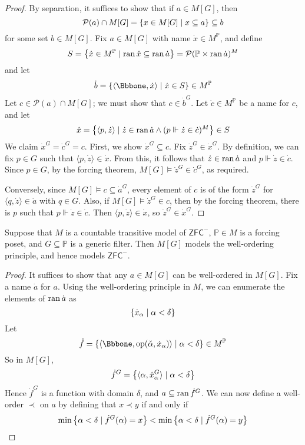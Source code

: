 \begin{proof}
    By separation, it suffices to show that if \( a \in M[G] \), then
    \[ \mathcal P(a) \cap M[G] = \qty{x \in M[G] \mid x \subseteq a} \subseteq b \]
    for some set \( b \in M[G] \).
    Fix \( a \in M[G] \) with name \( \dot x \in M^{\mathbb P} \), and define
    \[ S = \qty{\dot x \in M^{\mathbb P} \mid \operatorname{ran}\dot x \subseteq \operatorname{ran}\dot a} = \mathcal P(\mathbb P \times \operatorname{ran} \dot a)^M \]
    and let
    \[ \dot b = \qty{\langle \Bbbone, \dot x \rangle \mid \dot x \in S} \in M^{\mathbb P} \]
    Let \( c \in \mathcal P(a) \cap M[G] \); we must show that \( c \in \dot b^G \).
    Let \( \dot c \in M^{\mathbb P} \) be a name for \( c \), and let
    \[ \dot x = \qty{\langle p, \dot z \rangle \mid \dot z \in \operatorname{ran}\dot a \wedge (p \Vdash \dot z \in \dot c)^M} \in S \]
    We claim \( \dot x^G = \dot c^G = c \).
    First, we show \( \dot x^G \subseteq c \).
    Fix \( \dot z^G \in \dot x^G \).
    By definition, we can fix \( p \in G \) such that \( \langle p, \dot z \rangle \in \dot x \).
    From this, it follows that \( \dot z \in \operatorname{ran} \dot a \) and \( p \Vdash \dot z \in \dot c \).
    Since \( p \in G \), by the forcing theorem, \( M[G] \vDash \dot z^G \in \dot c^G \), as required.

    Conversely, since \( M[G] \vDash c \subseteq \dot a^G \), every element of \( c \) is of the form \( \dot z^G \) for \( \langle q, \dot z \rangle \in \dot a \) with \( q \in G \).
    Also, if \( M[G] \vDash \dot z^G \in c \), then by the forcing theorem, there is \( p \) such that \( p \Vdash \dot z \in \dot c \).
    Then \( \langle p, \dot z \rangle \in \dot x \), so \( \dot z^G \in \dot x^G \).
\end{proof}
\begin{lemma}
    Suppose that \( M \) is a countable transitive model of \( \mathsf{ZFC}^- \), \( \mathbb P \in M \) is a forcing poset, and \( G \subseteq \mathbb P \) is a generic filter.
    Then \( M[G] \) models the well-ordering principle, and hence models \( \mathsf{ZFC}^- \).
\end{lemma}
\begin{proof}
    It suffices to show that any \( a \in M[G] \) can be well-ordered in \( M[G] \).
    Fix a name \( \dot a \) for \( a \).
    Using the well-ordering principle in \( M \), we can enumerate the elements of \( \operatorname{ran} \dot a \) as
    \[ \qty{\dot x_\alpha \mid \alpha < \delta} \]
    Let
    \[ \dot f = \qty{\langle \Bbbone, \operatorname{op}(\check \alpha, \dot x_\alpha) \rangle \mid \alpha < \delta} \in M^{\mathbb P} \]
    So in \( M[G] \),
    \[ \dot f^G = \qty{\langle \alpha, \dot x_\alpha^G \rangle \mid \alpha < \delta} \]
    Hence \( \dot f^G \) is a function with domain \( \delta \), and \( a \subseteq \operatorname{ran} \dot f^G \).
    We can now define a well-order \( \prec \) on \( a \) by defining that \( x \prec y \) if and only if
    \[ \min\qty{\alpha < \delta \mid \dot f^G(\alpha) = x} < \min\qty{\alpha < \delta \mid \dot f^G(\alpha) = y} \]
\end{proof}
